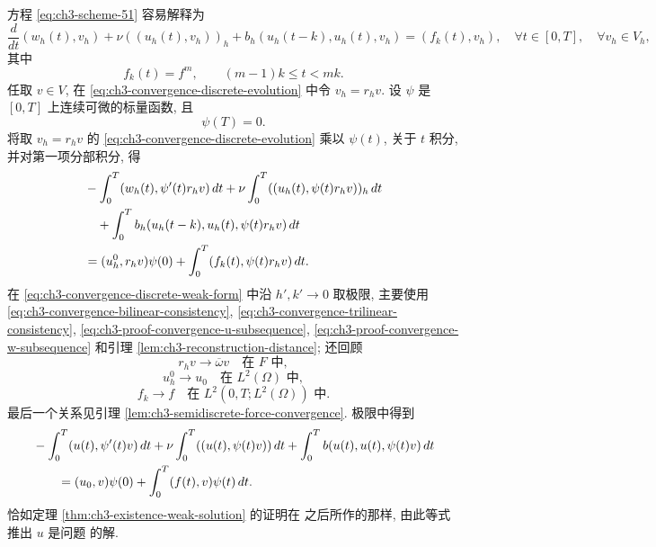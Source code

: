 \begin{Proof}
方程 \eqref{eq:ch3-scheme-51} 容易解释为
\begin{equation}
\frac d{dt}(w_h(t),v_h)+\nu((u_h(t),v_h))_h
+b_h(u_h(t-k),u_h(t),v_h)=(f_k(t),v_h),
\quad\forall t\in[0,T],\quad\forall v_h\in V_h,
\label{eq:ch3-convergence-discrete-evolution}
\end{equation}
其中
\begin{equation}
f_k(t)=f^m,
\qquad(m-1)k\leq t<mk.
\label{eq:ch3-convergence-piecewise-force}
\end{equation}
任取 $v\in V$, 在 \eqref{eq:ch3-convergence-discrete-evolution} 中令 $v_h=r_hv$. 设 $\psi$ 是 $[0,T]$ 上连续可微的标量函数, 且
\begin{equation}
\psi(T)=0.
\label{eq:ch3-convergence-test-terminal-zero}
\end{equation}
将取 $v_h=r_hv$ 的 \eqref{eq:ch3-convergence-discrete-evolution} 乘以 $\psi(t)$, 关于 $t$ 积分, 并对第一项分部积分, 得
\begin{align}
&-\int_0^T(w_h(t),\psi'(t)r_hv)\,dt
+\nu\int_0^T((u_h(t),\psi(t)r_hv))_h\,dt\notag\\
&\quad+\int_0^Tb_h(u_h(t-k),u_h(t),\psi(t)r_hv)\,dt\notag\\
&=(u_h^0,r_hv)\psi(0)+\int_0^T(f_k(t),\psi(t)r_hv)\,dt.
\label{eq:ch3-convergence-discrete-weak-form}
\end{align}
在 \eqref{eq:ch3-convergence-discrete-weak-form} 中沿 $h',k'\to0$ 取极限, 主要使用 \eqref{eq:ch3-convergence-bilinear-consistency}, \eqref{eq:ch3-convergence-trilinear-consistency}, \eqref{eq:ch3-proof-convergence-u-subsequence}, \eqref{eq:ch3-proof-convergence-w-subsequence} 和引理 \ref{lem:ch3-reconstruction-distance}; 还回顾
\begin{equation}
r_hv\to\overline\omega v\quad\text{在 }F\text{ 中},
\label{eq:ch3-convergence-restriction-strong}
\end{equation}
\begin{equation}
u_h^0\to u_0\quad\text{在 }L^2(\Omega)\text{ 中},
\label{eq:ch3-convergence-initial-projection-strong}
\end{equation}
\begin{equation}
f_k\to f\quad\text{在 }L^2(0,T;L^2(\Omega))\text{ 中}.
\label{eq:ch3-convergence-force-strong}
\end{equation}
最后一个关系见引理 \ref{lem:ch3-semidiscrete-force-convergence}. 极限中得到
\begin{align}
&-\int_0^T(u(t),\psi'(t)v)\,dt
+\nu\int_0^T((u(t),\psi(t)v))\,dt
+\int_0^Tb(u(t),u(t),\psi(t)v)\,dt\notag\\
&\qquad=(u_0,v)\psi(0)+\int_0^T(f(t),v)\psi(t)\,dt.
\label{eq:ch3-convergence-limit-weak-form}
\end{align}
恰如定理 \ref{thm:ch3-existence-weak-solution} 的证明在  之后所作的那样, 由此等式推出 $u$ 是问题  的解.


\end{Proof}

